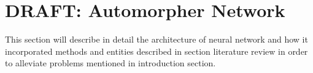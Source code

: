 \section{DRAFT: Automorpher Network}
\label{06:AutomorpherNetwork}
This section will describe in detail the architecture of neural network and how it incorporated methods and entities described in section literature review in order to alleviate problems mentioned in introduction section.